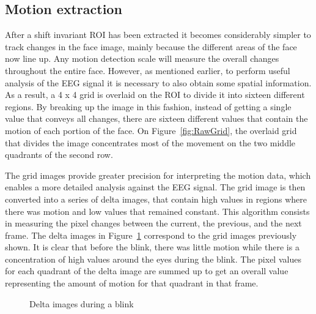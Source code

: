 \documentclass{acm_proc_article-sp}
\begin{document}
\subsection{Motion extraction}
After a shift invariant ROI has been extracted it becomes considerably
simpler to track changes in the face image, mainly because the
different areas of the face now line up. Any motion detection scale
will measure the overall changes throughout the entire face. However,
as mentioned earlier, to perform useful analysis of the EEG signal it
is necessary to also obtain some spatial information. As a result, a 4
x 4 grid is overlaid on the ROI to divide it into sixteen different
regions. By breaking up the image in this fashion, instead of getting
a single value that conveys all changes, there are sixteen different
values that contain the motion of each portion of the face.  On
Figure~\ref{fig:RawGrid}, the overlaid grid that divides the image
concentrates most of the movement on the two middle quadrants of the
second row.

The grid images provide greater precision for interpreting the motion
data, which enables a more detailed analysis against the EEG signal.
The grid image is then converted into a series of delta
images\cite{collins2000}, that contain high values in regions where
there was motion and low values that remained constant.  This
algorithm consists in measuring the pixel changes between the current,
the previous, and the next frame. The delta images in Figure~\ref{fig:Delta}
correspond to the grid images previously shown. It is clear that
before the blink, there was little motion while there is a
concentration of high values around the eyes during the blink.  The
pixel values for each quadrant of the delta image are summed up to get
an overall value representing the amount of motion for that quadrant
in that frame.

\begin{figure}
  \hfill
  \caption{Delta images during a blink}\label{fig:Delta}
\end{figure}
\end{document}
